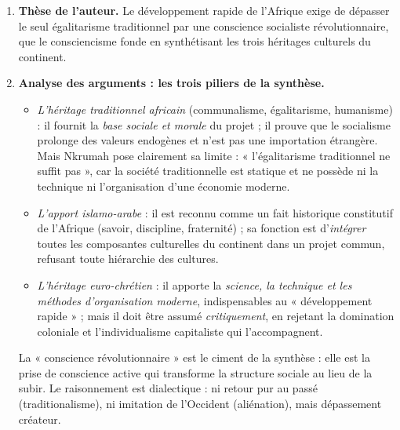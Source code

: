 \documentclass[11pt]{article}
\begin{document}
\begin{corrige}
\begin{enumerate}
\item \textbf{Thèse de l'auteur.} Le développement rapide de l'Afrique exige de dépasser le seul égalitarisme traditionnel par une conscience socialiste révolutionnaire, que le consciencisme fonde en synthétisant les trois héritages culturels du continent.
\item \textbf{Analyse des arguments : les trois piliers de la synthèse.}
\begin{itemize}
\item \emph{L'héritage traditionnel africain} (communalisme, égalitarisme, humanisme) : il fournit la \emph{base sociale et morale} du projet ; il prouve que le socialisme prolonge des valeurs endogènes et n'est pas une importation étrangère. Mais Nkrumah pose clairement sa limite : « l'égalitarisme traditionnel ne suffit pas », car la société traditionnelle est statique et ne possède ni la technique ni l'organisation d'une économie moderne.
\item \emph{L'apport islamo-arabe} : il est reconnu comme un fait historique constitutif de l'Afrique (savoir, discipline, fraternité) ; sa fonction est d'\emph{intégrer} toutes les composantes culturelles du continent dans un projet commun, refusant toute hiérarchie des cultures.
\item \emph{L'héritage euro-chrétien} : il apporte la \emph{science, la technique et les méthodes d'organisation moderne}, indispensables au « développement rapide » ; mais il doit être assumé \emph{critiquement}, en rejetant la domination coloniale et l'individualisme capitaliste qui l'accompagnent.
\end{itemize}
La « conscience révolutionnaire » est le ciment de la synthèse : elle est la prise de conscience active qui transforme la structure sociale au lieu de la subir. Le raisonnement est dialectique : ni retour pur au passé (traditionalisme), ni imitation de l'Occident (aliénation), mais dépassement créateur.

\end{enumerate}
\end{corrige}
\end{document}
